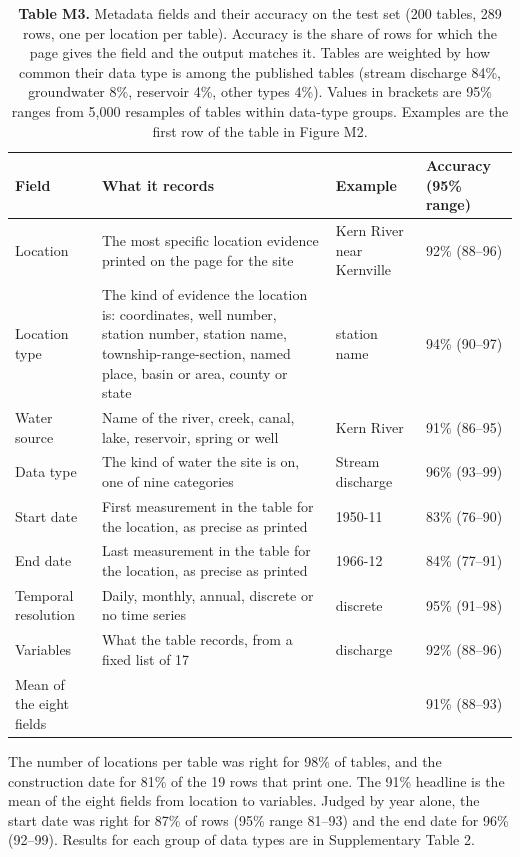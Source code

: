 \begin{table}[htbp]
\centering
\small

\caption*{\textbf{Table M3.} Metadata fields and their accuracy on the test set (200 tables, 289 rows, one per location per table). Accuracy is the share of rows for which the page gives the field and the output matches it. Tables are weighted by how common their data type is among the published tables (stream discharge 84\%, groundwater 8\%, reservoir 4\%, other types 4\%). Values in brackets are 95\% ranges from 5,000 resamples of tables within data-type groups. Examples are the first row of the table in Figure M2.}
\begin{tabularx}{\textwidth}{l>{\raggedright\arraybackslash}Xll}
\toprule
\textbf{Field} & \textbf{What it records} & \textbf{Example} & \textbf{Accuracy (95\% range)} \\
\midrule
Location & The most specific location evidence printed on the page for the site & Kern River near Kernville & 92\% (88--96) \\
Location type & The kind of evidence the location is: coordinates, well number, station number, station name, township-range-section, named place, basin or area, county or state & station name & 94\% (90--97) \\
Water source & Name of the river, creek, canal, lake, reservoir, spring or well & Kern River & 91\% (86--95) \\
Data type & The kind of water the site is on, one of nine categories & Stream discharge & 96\% (93--99) \\
Start date & First measurement in the table for the location, as precise as printed & 1950-11 & 83\% (76--90) \\
End date & Last measurement in the table for the location, as precise as printed & 1966-12 & 84\% (77--91) \\
Temporal resolution & Daily, monthly, annual, discrete or no time series & discrete & 95\% (91--98) \\
Variables & What the table records, from a fixed list of 17 & discharge & 92\% (88--96) \\
Mean of the eight fields &  &  & 91\% (88--93) \\
\bottomrule
\end{tabularx}
\end{table}

The number of locations per table was right for 98\% of tables, and the construction date for 81\% of the 19 rows that print one. The 91\% headline is the mean of the eight fields from location to variables. Judged by year alone, the start date was right for 87\% of rows (95\% range 81--93) and the end date for 96\% (92--99). Results for each group of data types are in Supplementary Table 2.
